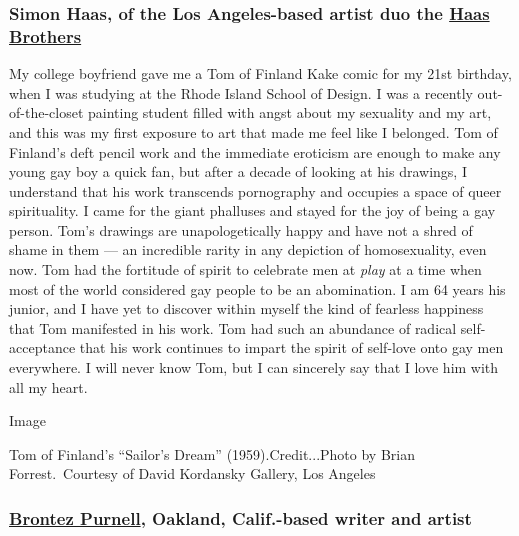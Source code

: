 \hypertarget{simon-haas-of-the-los-angeles-based-artist-duo-the-haas-brothers}{%
\subsubsection{\texorpdfstring{\textbf{Simon Haas, of the Los
Angeles-based artist duo the}
\textbf{\href{http://www.thehaasbrothers.com/}{Haas
Brothers}}}{Simon Haas, of the Los Angeles-based artist duo the Haas Brothers}}\label{simon-haas-of-the-los-angeles-based-artist-duo-the-haas-brothers}}

My college boyfriend gave me a Tom of Finland Kake comic for my 21st
birthday, when I was studying at the Rhode Island School of Design. I
was a recently out-of-the-closet painting student filled with angst
about my sexuality and my art, and this was my first exposure to art
that made me feel like I belonged. Tom of Finland's deft pencil work and
the immediate eroticism are enough to make any young gay boy a quick
fan, but after a decade of looking at his drawings, I understand that
his work transcends pornography and occupies a space of queer
spirituality. I came for the giant phalluses and stayed for the joy of
being a gay person. Tom's drawings are unapologetically happy and have
not a shred of shame in them --- an incredible rarity in any depiction
of homosexuality, even now. Tom had the fortitude of spirit to celebrate
men at \emph{play} at a time when most of the world considered gay
people to be an abomination. I am 64 years his junior, and I have yet to
discover within myself the kind of fearless happiness that Tom
manifested in his work. Tom had such an abundance of radical
self-acceptance that his work continues to impart the spirit of
self-love onto gay men everywhere. I will never know Tom, but I can
sincerely say that I love him with all my heart.

Image

Tom of Finland's ``Sailor's Dream'' (1959).Credit...Photo by Brian
Forrest.~Courtesy of David Kordansky Gallery, Los Angeles

\hypertarget{brontez-purnell-oakland-calif-based-writer-and-artist}{%
\subsubsection{\texorpdfstring{\textbf{\href{https://www.whiting.org/awards/winners/brontez-purnell}{Brontez
Purnell}, Oakland, Calif.-based writer and
artist}}{Brontez Purnell, Oakland, Calif.-based writer and artist}}\label{brontez-purnell-oakland-calif-based-writer-and-artist}}


